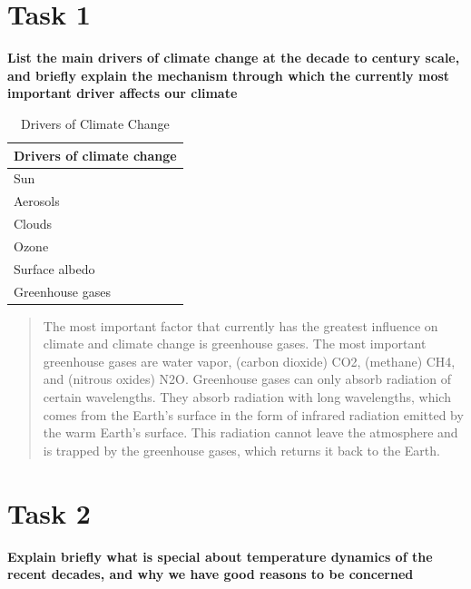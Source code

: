 \documentclass[
]{book}
\begin{document}
\hypertarget{task-1-1}{%
\section{Task 1}\label{task-1-1}}

\textbf{List the main drivers of climate change at the decade to century scale, and briefly explain the mechanism through which the currently most important driver affects our climate}

\begin{table}

\caption{\label{tab:unnamed-chunk-2}Drivers of Climate Change}
\centering
\begin{tabular}[t]{l}
\hline
Drivers of climate change\\
\hline
Sun\\
\hline
Aerosols\\
\hline
Clouds\\
\hline
Ozone\\
\hline
Surface albedo\\
\hline
Greenhouse gases\\
\hline
\end{tabular}
\end{table}

\begin{quote}
The most important factor that currently has the greatest influence on climate and climate change is greenhouse gases. The most important greenhouse gases are water vapor, (carbon dioxide) CO2, (methane) CH4, and (nitrous oxides) N2O. Greenhouse gases can only absorb radiation of certain wavelengths. They absorb radiation with long wavelengths, which comes from the Earth's surface in the form of infrared radiation emitted by the warm Earth's surface. This radiation cannot leave the atmosphere and is trapped by the greenhouse gases, which returns it back to the Earth.
\end{quote}

\hypertarget{task-2-1}{%
\section{Task 2}\label{task-2-1}}

\textbf{Explain briefly what is special about temperature dynamics of the recent decades, and why we have good reasons to be concerned}
\end{document}
